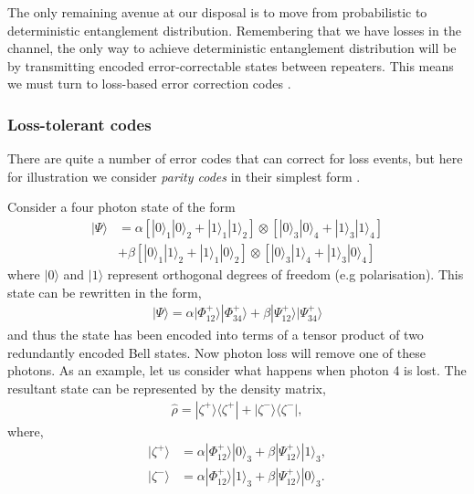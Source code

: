 The only remaining avenue at our disposal is to move from probabilistic to deterministic entanglement distribution. Remembering that we have losses in the channel, the only way to achieve deterministic entanglement distribution will be by transmitting encoded error-correctable states between repeaters. This means we must turn to loss-based error correction codes \cite{bib:ralph05, bib:munro12, bib:Fowler10, bib:ATL13, bib:MKLLJ14}.  

\subsubsection{Loss-tolerant codes}

There are quite a number of error codes that can correct for loss events, but here for illustration we consider \textit{parity codes} in their simplest form \cite{bib:ralph05, bib:munro12}. 

Consider a four photon state of the form
\begin{align}
|\Psi\rangle &= \alpha \left[|0\rangle_1 |0\rangle_2+|1\rangle_1 |1\rangle_2\right] \otimes \left[|0\rangle_3 |0\rangle_4+|1\rangle_3 |1\rangle_4\right] \nonumber \\
&+ \beta \left[|0\rangle_1 |1\rangle_2+|1\rangle_1 |0\rangle_2\right] \otimes \left[|0\rangle_3 |1\rangle_4+|1\rangle_3 |0\rangle_4\right]
\end{align}
where $|0\rangle$ and $|1\rangle$ represent orthogonal degrees of freedom (e.g polarisation). This state can be rewritten in the form,
\begin{align}\label{eq:third_gen_red_enc}
|\Psi\rangle = \alpha |\Phi_{12}^+\rangle  |\Phi_{34}^+\rangle+\beta |\Psi_{12}^+\rangle  |\Psi_{34}^+\rangle
\end{align}
and thus the state has been encoded into terms of a tensor product of two redundantly encoded Bell states. Now photon loss will remove one of these photons. As an example, let us consider what happens when photon 4 is lost. The resultant state can be represented by the density matrix,
\begin{align}
	\hat\rho= |\zeta^+\rangle \langle \zeta^+| +|\zeta^-\rangle \langle \zeta^-|,
	\end{align}
where,
\begin{align}
|\zeta^+\rangle &=  \alpha |\Phi_{12}^+\rangle |0\rangle_3 + \beta  |\Psi_{12}^+\rangle |1\rangle_3, \nonumber \\
|\zeta^-\rangle &=  \alpha |\Phi_{12}^+\rangle |1\rangle_3 + \beta  |\Psi_{12}^+\rangle |0\rangle_3.
\end{align}

